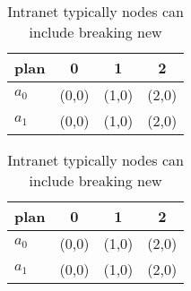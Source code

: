 \documentclass[a4paper]{article}
\begin{document}
\begin{table}
\begin{adjustbox}{width=0.6\columnwidth}
\begin{tabular}{|l|l|l|l|}
\hline
\textbf{plan} & \multicolumn{1}{c|}{\textbf{0}} & \multicolumn{1}{c|}{\textbf{1}} & \multicolumn{1}{c|}{\textbf{2}} \\ \hline
\textbf{$a_0$}  & (0,0) & (1,0) & (2,0) \\ \hline
\textbf{$a_1$}  & (0,0) & (1,0) & (2,0) \\ \hline
\end{tabular}
\end{adjustbox}
\caption{Intranet typically nodes can include breaking new
}
\end{table}

\begin{table}
\begin{adjustbox}{width=0.6\columnwidth}
\begin{tabular}{|l|l|l|l|}
\hline
\textbf{plan} & \multicolumn{1}{c|}{\textbf{0}} & \multicolumn{1}{c|}{\textbf{1}} & \multicolumn{1}{c|}{\textbf{2}} \\ \hline
\textbf{$a_0$}  & (0,0) & (1,0) & (2,0) \\ \hline
\textbf{$a_1$}  & (0,0) & (1,0) & (2,0) \\ \hline
\end{tabular}
\end{adjustbox}
\caption{Intranet typically nodes can include breaking new
}
\end{table}
\end{document}

